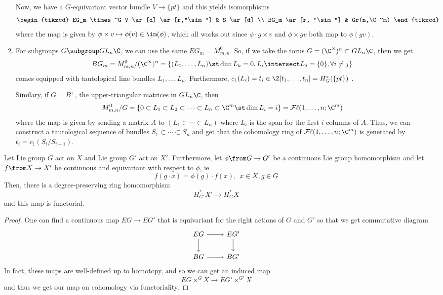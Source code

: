 \documentclass[11pt,leqno,oneside]{amsbook}
\numberwithin{thm}{section}
\newcommand{\Fl}{\mathcal{F\ell}}
\newcommand{\Gr}{Gr}
\begin{document}
\begin{example}
\begin{enumerate}
    Now, we have a \(G\)-equivariant vector bundle \(V \to \{pt\}\)
    and this yields isomorphisms \[
      \begin{tikzcd}
        EG_m \times^G V \ar[d] \ar[r,"\sim"] & S \ar[d] \\
        BG_m \ar[r, "\sim"] & \Gr(n,\C^m)
      \end{tikzcd}
    \]
    where the map is given by \(\phi \times v \mapsto \phi(v) \in
    \im(\phi)\), which all works out since \(\phi \cdot g \times v\)
    and \(\phi \times gv\) both map to \(\phi(gv)\).
  \item For subgroups \(G \subgroup GL_n \C\), we can use the same
    \(EG_m = M_{m,n}^0\). So, if we take the torus \(G = (\C^\times)^n \subset
    GL_n \C\), then we get \[
      BG_m = M_{m,n}^0 / (\C^\times)^n = \left\{ (L_1, \ldots, L_n)
        \st \dim L_k = 0, L_i \intersect L_j = \{0\}, \forall i \neq j
        \right\} 
    \]
    comes equipped with tautological line bundles \(L_1,\ldots,
    L_n\). Furthermore, \(c_1(L_i) = t_i \in \Z[t_1, \ldots, t_n] =
    H^*_G(\{pt\})\) .

    Similary, if \(G = B^+\), the upper-triangular matrices in
    \(GL_n\C\), then \[
      M_{m,n}^0/G = \{0 \subset L_1 \subset L_2 \subset \cdots \subset
      L_n \subset \C^m \st \dim L_i = i\} = \Fl(1,\ldots,n;\C^m)
    \]
    where the map is given by sending a matrix \(A\) to \((L_1 \subset
    \cdots \subset L_n)\) where \(L_i\) is the span for the first
    \(i\) columns of \(A\). Thus, we can construct a tautological
    sequence of bundles \(S_1 \subset \cdots \subset S_n\) and
    get that the cohomology ring of \(\Fl(1, \ldots, n; \C^m)\) is
    generated by \(t_i = c_1(S_i/S_{i-1})\). 
  \end{enumerate}
\end{example}
\begin{prop}
  Let Lie group \(G\) act on \(X\) and Lie group \(G'\) act on
  \(X'\). Furthermore, let \(\phi \from G \to G'\) be a continuous Lie
  group homomorphism and let \(f \from X \to X'\) be continuous and
  equivariant with respect to \(\phi\), ie \[
    f(g \cdot x) = \phi(g) \cdot f(x), \ \ x \in X, g \in G
  \]
  Then, there is a degree-preserving ring homomorphism \[
    H_{G'}^* X' \to H_G^* X
  \]
  and this map is functorial.
\end{prop}
\begin{proof}
  One can find a continuous map \(EG \to EG'\)  that is equivariant
  for the right actions of \(G\) and \(G'\) so that we get commutative
  diagram \[
    \begin{tikzcd}
      EG \ar[d]\ar[r] & EG' \ar[d]\\
      BG \ar[r] & BG'
    \end{tikzcd}
  \]
  In fact, these maps are well-defined up to homotopy, and so we can
  get an induced map \[
    EG \times^G X \to EG' \times^{G'} X
  \]
  and thus we get our map on cohomology via functoriality. 
\end{proof}
\end{document}
